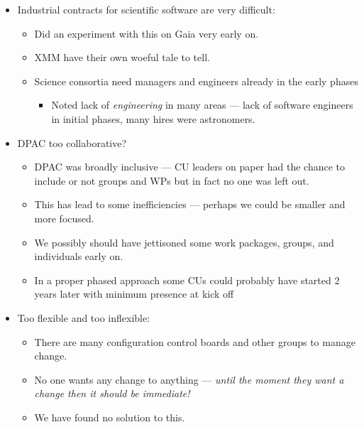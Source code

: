 {\begin{itemize}
\begin{itemize}
      \item ESA is stepping back from this type of role in future missions and was not
        totally happy about the level of involvement of ESAC in DPAC.
    \end{itemize}
  \item Industrial contracts for scientific software are very difficult:
    \begin{itemize}
      \item Did an experiment with this on Gaia very early on.
      \item XMM have their own woeful tale to tell.
	\item Science consortia need managers and engineers already in the early phases
    \begin{itemize}
	
        \item  Noted lack of {\em engineering} in many areas ---
          {\color{red} lack of software engineers in initial phases, many hires were astronomers}.
    \end{itemize}

    \end{itemize}



\item DPAC too collaborative? 
  \begin{itemize}
    \item DPAC was broadly inclusive --- CU leaders on paper had the chance to include or not groups
      and WPs but in fact no one was left out.
    \item This has lead to some inefficiencies --- perhaps we could be smaller and more focused.
    \item We possibly should have jettisoned some work packages, groups, and individuals early on.
    \item {\color{blue} In a proper phased approach some CUs could probably have started 2 years
    later with minimum presence at kick off} 
  \end{itemize}
\item Too flexible and too inflexible:
  \begin{itemize}
    \item There are many configuration control boards and other groups to manage change.
    \item {\color{blue}No one wants any change to anything --- {\em until the moment they want a change  then it
      should be immediate!}}
    \item {\color{red} We have found no solution to this.} 
  \end{itemize}
\end{itemize}
}





